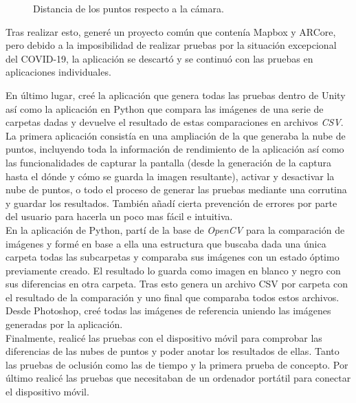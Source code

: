\begin{figure}[H]
    \caption[Distancia de los puntos respecto a la cámara.]{Distancia de los puntos respecto a la cámara.}
    \label{fig:Puntos colores}
\end{figure}

Tras realizar esto, generé un proyecto común que contenía Mapbox y ARCore, pero debido a la imposibilidad de realizar pruebas por la situación excepcional del COVID-19, la aplicación se descartó y se continuó con las pruebas en aplicaciones individuales. 

En último lugar, creé la aplicación que genera todas las pruebas dentro de Unity así como la aplicación en Python que compara las imágenes de una serie de carpetas dadas y devuelve el resultado de estas comparaciones en archivos \textit{CSV}. La primera aplicación consistía en una ampliación de la que generaba la nube de puntos, incluyendo toda la información de rendimiento de la aplicación así como las funcionalidades de capturar la pantalla (desde la generación de la captura hasta el dónde y cómo se guarda la imagen resultante), activar y desactivar la nube de puntos, o todo el proceso de generar las pruebas mediante una corrutina y guardar los resultados. También añadí cierta prevención de errores por parte del usuario para hacerla un poco mas fácil e intuitiva.\\

En la aplicación de Python, partí de la base de \textit{OpenCV} para la comparación de imágenes y formé en base a ella una estructura que buscaba dada una única carpeta todas las subcarpetas y comparaba sus imágenes con un estado óptimo previamente creado. El resultado lo guarda como imagen en blanco y negro con sus diferencias en otra carpeta. Tras esto genera un archivo CSV por carpeta con el resultado de la comparación y uno final que comparaba todos estos archivos. Desde Photoshop, creé todas las imágenes de referencia uniendo las imágenes generadas por la aplicación.\\

Finalmente, realicé las pruebas con el dispositivo móvil para comprobar las diferencias de las nubes de puntos y poder anotar los resultados de ellas. Tanto las pruebas de oclusión como las de tiempo y la primera prueba de concepto. Por último realicé las pruebas que necesitaban de un ordenador portátil para conectar el dispositivo móvil.